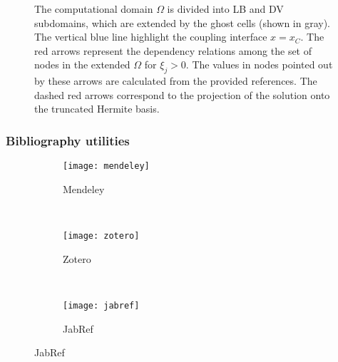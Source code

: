 \documentclass[mathserif]{beamer}
\begin{document}
\begin{frame}
\begin{figure}
        \hspace{-20pt}
        \caption{\scriptsize
            The computational domain \(\Omega\) is divided into LB and DV subdomains,
            which are extended by the ghost cells (shown in gray).
            The vertical blue line highlight the coupling interface \(x=x_C\).
            The red arrows represent the dependency relations
            among the set of nodes in the extended \(\Omega\) for \(\xi_j>0\).
            The values in nodes pointed out by these arrows are calculated from the provided references.
            The dashed red arrows correspond to the projection of the solution onto the truncated Hermite basis.
        }
        \label{fig:coupling_scheme}
    \end{figure}
\end{frame}

\begin{frame}
    \frametitle{Bibliography utilities}
    \centering
    \begin{figure}
        \centering
        \begin{subfigure}[b]{0.3\textwidth}
            \texttt{[image: mendeley]}
            \caption{Mendeley}
            \label{fig:gull}
        \end{subfigure}
        ~ %
        \begin{subfigure}[b]{0.3\textwidth}
            \texttt{[image: zotero]}
            \caption{Zotero}
            \label{fig:tiger}
        \end{subfigure}
        ~ %
        \begin{subfigure}[b]{0.3\textwidth}
            \texttt{[image: jabref]}
            \caption{JabRef}
            \label{fig:mouse}
        \end{subfigure}
    \end{figure}
\end{frame}
\end{document}
